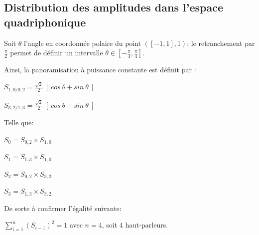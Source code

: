 \subsection*{Distribution des amplitudes dans l'espace quadriphonique}
\label{pandist}
\bigskip
\bigskip

\begin{center}
\end{center}

\bigskip

Soit $\theta$ l'angle en coordonn\'ee polaire du point $([-1,1],1)$; le retranchement par $\frac{\pi}{2}$ permet de d\'efinir un intervalle  $\theta \in [ - \frac{\pi}{4}, \frac{\pi}{4}]$.

\smallskip

\noindent Ainsi, la panoramisation \`a puissance constante est d\'efinit par \citep[ p. 134]{cr}:
\smallskip

$S_{1,0/0,2} = \frac{\sqrt{2}}{2} \: [ \: cos \: \theta + sin \: \theta \: ]$

$S_{3,2/1,3} = \frac{\sqrt{2}}{2} \: [ \: cos \: \theta - sin \: \theta \: ]$

\smallskip

\noindent Telle que:

$S_0=S_{0,2} \times S_{1,0}$

$S_1=S_{1,3} \times S_{1,0}$

$S_2=S_{0,2} \times S_{3,2}$

$S_3=S_{1,3} \times S_{3,2}$

\smallskip

\noindent De sorte \`a confirmer l'\'egalit\'e suivante:

\smallskip

$\displaystyle \sum_{i=1}^{n} (S_{i-1})^2 =1$ avec $n=4$, soit 4 haut-parleurs. 

